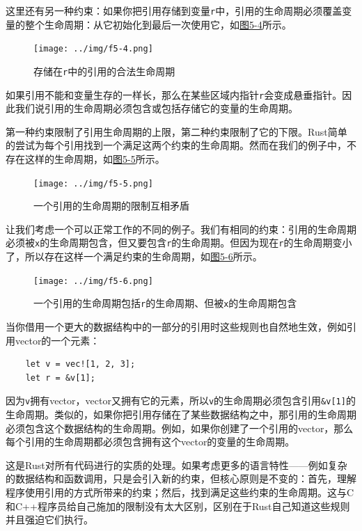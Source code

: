 这里还有另一种约束：如果你把引用存储到变量\texttt{r}中，引用的生命周期必须覆盖变量的整个生命周期：从它初始化到最后一次使用它，如\hyperref[f5-4]{图5-4}所示。

\begin{figure}[htbp]
    \centering
    \texttt{[image: ../img/f5-4.png]}
    \caption{存储在\texttt{r}中的引用的合法生命周期}
    \label{f5-4}
\end{figure}

如果引用不能和变量生存的一样长，那么在某些区域内指针\texttt{r}会变成悬垂指针。因此我们说引用的生命周期必须包含或包括存储它的变量的生命周期。

第一种约束限制了引用生命周期的上限，第二种约束限制了它的下限。Rust简单的尝试为每个引用找到一个满足这两个约束的生命周期。然而在我们的例子中，不存在这样的生命周期，如\hyperref[f5-5]{图5-5}所示。

\begin{figure}[htbp]
    \centering
    \texttt{[image: ../img/f5-5.png]}
    \caption{一个引用的生命周期的限制互相矛盾}
    \label{f5-5}
\end{figure}

让我们考虑一个可以正常工作的不同的例子。我们有相同的约束：引用的生命周期必须被\texttt{x}的生命周期包含，但又要包含\texttt{r}的生命周期。但因为现在\texttt{r}的生命周期变小了，所以存在这样一个满足约束的生命周期，如\hyperref[f5-6]{图5-6}所示。

\begin{figure}[htbp]
    \centering
    \texttt{[image: ../img/f5-6.png]}
    \caption{一个引用的生命周期包括\texttt{r}的生命周期、但被\texttt{x}的生命周期包含}
    \label{f5-6}
\end{figure}

当你借用一个更大的数据结构中的一部分的引用时这些规则也自然地生效，例如引用vector的一个元素：
\begin{verbatim}
    let v = vec![1, 2, 3];
    let r = &v[1];
\end{verbatim}

因为\texttt{v}拥有vector，vector又拥有它的元素，所以\texttt{v}的生命周期必须包含引用\texttt{\&v[1]}的生命周期。类似的，如果你把引用存储在了某些数据结构之中，那引用的生命周期必须包含这个数据结构的生命周期。例如，如果你创建了一个引用的vector，那么每个引用的生命周期都必须包含拥有这个vector的变量的生命周期。

这是Rust对所有代码进行的实质的处理。如果考虑更多的语言特性——例如复杂的数据结构和函数调用，只是会引入新的约束，但核心原则是不变的：首先，理解程序使用引用的方式所带来的约束；然后，找到满足这些约束的生命周期。这与C和C++程序员给自己施加的限制没有太大区别，区别在于Rust自己知道这些规则并且强迫它们执行。


